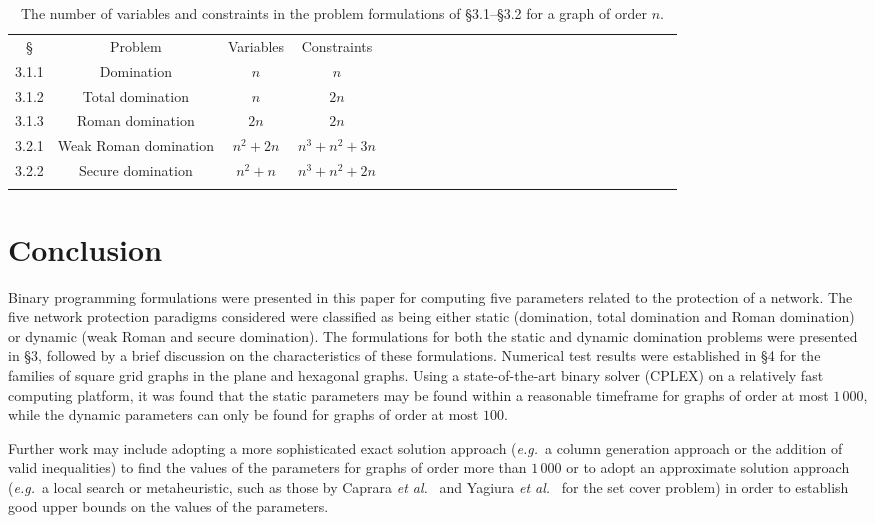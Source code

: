 \documentclass[10pt,a4paper]{article}
\newcommand{\headcol}{\rowcolor{tableheadcolor}}
\newcommand{\rowcol}{\rowcolor{tablerowcolor}}
\newcommand{\topline}{\arrayrulecolor{black}\specialrule{0.1em}{\abovetopsep}{0pt}%
	\arrayrulecolor{tableheadcolor}\specialrule{\belowrulesep}{0pt}{0pt}%
	\arrayrulecolor{black}}
\newcommand{\midline}{\arrayrulecolor{tableheadcolor}\specialrule{\aboverulesep}{0pt}{0pt}%
	\arrayrulecolor{black}\specialrule{\lightrulewidth}{0pt}{0pt}%
	\arrayrulecolor{white}\specialrule{\belowrulesep}{0pt}{0pt}%
	\arrayrulecolor{black}}
\newcommand{\bottomline}{\arrayrulecolor{white}\specialrule{\aboverulesep}{0pt}{0pt}%
	\arrayrulecolor{black}\specialrule{\heavyrulewidth}{0pt}{\belowbottomsep}}%
\begin{document}
 \begin{table}[h]
	\centering\footnotesize
		\begin{tabular}{ccccrccrccccccccccccccccc}
    \topline    \headcol
   \S&Problem&Variables&Constraints \\\midline
  3.1.1& Domination&$n$&$n$\\\rowcol
  3.1.2& Total domination&$n$&$2n$\\
  3.1.3& Roman domination&$2n$&$2n$\\\rowcol
  3.2.1&Weak Roman domination & $n^2 +2n$& $n^3 + n^2 + 3n$\\
  3.2.2& Secure domination & $n^2 +n$&$n^3  + n^2 + 2n$\\ 
 	\bottomline

		\end{tabular}
\vspace{0.5cm}
	\caption{The number of variables and constraints in the problem formulations of \S3.1--\S3.2 for a graph of order $n$.}
	\label{tab:charac}
\end{table}


\section{Conclusion}

Binary programming formulations were presented in this paper for computing five parameters related to the protection of a network.  The five network protection paradigms considered were classified as being either static (domination, total domination and Roman domination) or dynamic (weak Roman and secure domination). The formulations for both the static and dynamic domination problems were presented in \S3, followed by a brief discussion on the characteristics of these formulations. Numerical test results were established in \S4 for the families of square grid graphs in the plane and hexagonal graphs. Using a state-of-the-art binary solver (CPLEX) on a relatively fast computing platform, it was found that the static parameters may be found within a reasonable timeframe for graphs of order at most $1\,000$, while the dynamic parameters can only be found for graphs of order at most $100$. 

Further work may include adopting a more sophisticated exact solution approach ({\em e.g.}\ a column generation approach or the addition of valid inequalities) to find the values of the parameters for graphs of order more than $1\,000$ or to adopt an approximate solution approach ({\em e.g.}\ a local search or metaheuristic, such as those by Caprara {\em et al.}~\cite{CapraraTothFischetti2000} and Yagiura {\em et al.}~\cite{YagiuraKishidaIbaraki2006} for the set cover problem) in order to establish good upper bounds on the values of the parameters.
\end{document}
